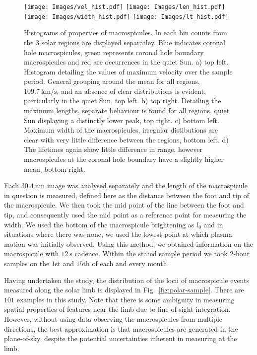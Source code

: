 \begin{figure*}[t!]
	\centering
	\texttt{[image: Images/vel\_hist.pdf]}
	\texttt{[image: Images/len\_hist.pdf]}\\
	
	\texttt{[image: Images/width\_hist.pdf]}
	\texttt{[image: Images/lt\_hist.pdf]}	
	\caption{\small Histograms of properties of macrospicules. In each bin counts from the 3 solar regions are displayed separatley. Blue indicates coronal hole macrospicules, green represents coronal hole boundary macrospicules and red are occurrences in the quiet Sun. a) top left. Histogram detailing the values of maximum velocity over the sample period. General grouping around the mean for all regions, $109.7\ \textrm{km/s}$, and an absence of clear distributions is evident, particularly in the quiet Sun, top left. b) top right. Detailing the maximum lengths, separate behaviour is found for all regions, quiet Sun displaying a distinctly lower peak, top right. c) bottom left. Maximum width of the macrospicules, irregular distibutions are clear with very little difference between the regions, bottom left. d) The lifetimes again show little difference in range, however macrospicules at the coronal hole boundary have a slightly higher mean, bottom right.}
	\label{fig:basic-prop}
\end{figure*}


Each $30.4\ \textrm{nm}$ image was analysed separately and the length of the macrospicule in question is measured, defined here as the distance between the foot and tip of the macrospicule. We then took the mid point of the line between the foot and tip, and consequently used the mid point as a reference point for measuring the width. We used the bottom of the macrospicule brightening as $l_0$ and in situations where there was none, we used the lowest point at which plasma motion was initially observed. Using this method, we obtained information on the macrospicule with $12\ \textrm{s}$ cadence. Within the stated sample period we took $2$-hour samples on the $1$st and $15$th of each and every month.

Having undertaken the study, the distribution of the locii of macrospicule events measured along the solar limb is displayed in Fig.~\ref{fig:polar-sample}. There are $101$ examples in this study. Note that there is some ambiguity in measuring spatial properties of features near the limb due to line-of-sight integration. However, without using data observing the macrospicules from multiple directions, the best approximation is that macrospicules are generated in the plane-of-sky, despite the potential uncertainties inherent in measuring at the limb.



